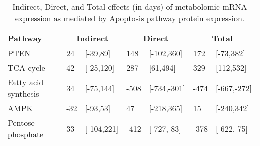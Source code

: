 \begin{table}[ht]
\centering
\begin{tabular}{lllllll}
  \hline
  Pathway & \multicolumn{2}{c}{Indirect} & \multicolumn{2}{c}{Direct}  & \multicolumn{2}{c}{Total} \\
 \hline
PTEN & 24 & [-39,89] & 148 & [-102,360] & 172 & [-73,382] \\ 
  TCA cycle & 42 & [-25,120] & 287 & [61,494] & 329 & [112,532] \\ 
  Fatty acid synthesis & 34 & [-75,144] & -508 & [-734,-301] & -474 & [-667,-272] \\ 
  AMPK & -32 & [-93,53] & 47 & [-218,365] & 15 & [-240,342] \\ 
  Pentose phosphate & 33 & [-104,221] & -412 & [-727,-83] & -378 & [-622,-75] \\ 
   \hline
\end{tabular}
\caption{Indirect, Direct, and Total effects (in days) of metabolomic mRNA expression as mediated by Apoptosis pathway protein expression.} 
\end{table}
